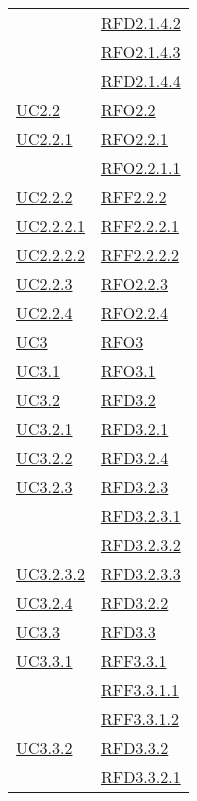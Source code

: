 \begin{longtable}{|>{\centering}m{5cm}|m{5cm}<{\centering}|}
& \hyperlink{RFD2.1.4.2}{RFD2.1.4.2}\\
& \hyperlink{RFO2.1.4.3}{RFO2.1.4.3}\\
& \hyperlink{RFD2.1.4.4}{RFD2.1.4.4}\\ \hline
\hyperref[UC2.2]{UC2.2} & \hyperlink{RFO2.2}{RFO2.2}\\ \hline
\hyperref[UC2.2.1]{UC2.2.1} & \hyperlink{RFO2.2.1}{RFO2.2.1}\\
& \hyperlink{RFO2.2.1.1}{RFO2.2.1.1}\\ \hline
\hyperref[UC2.2.2]{UC2.2.2} & \hyperlink{RFF2.2.2}{RFF2.2.2}\\ \hline
\hyperref[UC2.2.2.1]{UC2.2.2.1} & \hyperlink{RFF2.2.2.1}{RFF2.2.2.1}\\ \hline
\hyperref[UC2.2.2.2]{UC2.2.2.2} & \hyperlink{RFF2.2.2.2}{RFF2.2.2.2}\\ \hline
\hyperref[UC2.2.3]{UC2.2.3} & \hyperlink{RFO2.2.3}{RFO2.2.3}\\ \hline
\hyperref[UC2.2.4]{UC2.2.4} & \hyperlink{RFO2.2.4}{RFO2.2.4}\\ \hline
\hyperref[UC3]{UC3} & \hyperlink{RFO3}{RFO3}\\ \hline
\hyperref[UC3.1]{UC3.1} & \hyperlink{RFO3.1}{RFO3.1}\\ \hline
\hyperref[UC3.2]{UC3.2} & \hyperlink{RFD3.2}{RFD3.2}\\ \hline
\hyperref[UC3.2.1]{UC3.2.1} & \hyperlink{RFD3.2.1}{RFD3.2.1}\\ \hline
\hyperref[UC3.2.2]{UC3.2.2} & \hyperlink{RFD3.2.4}{RFD3.2.4}\\ \hline
\hyperref[UC3.2.3]{UC3.2.3} & \hyperlink{RFD3.2.3}{RFD3.2.3}\\
& \hyperlink{RFD3.2.3.1}{RFD3.2.3.1}\\
& \hyperlink{RFD3.2.3.2}{RFD3.2.3.2}\\ \hline
\hyperref[UC3.2.3.2]{UC3.2.3.2} & \hyperlink{RFD3.2.3.3}{RFD3.2.3.3}\\ \hline
\hyperref[UC3.2.4]{UC3.2.4} & \hyperlink{RFD3.2.2}{RFD3.2.2}\\ \hline
\hyperref[UC3.3]{UC3.3} & \hyperlink{RFD3.3}{RFD3.3}\\ \hline
\hyperref[UC3.3.1]{UC3.3.1} & \hyperlink{RFF3.3.1}{RFF3.3.1}\\
& \hyperlink{RFF3.3.1.1}{RFF3.3.1.1}\\
& \hyperlink{RFF3.3.1.2}{RFF3.3.1.2}\\ \hline
\hyperref[UC3.3.2]{UC3.3.2} & \hyperlink{RFD3.3.2}{RFD3.3.2}\\
& \hyperlink{RFD3.3.2.1}{RFD3.3.2.1}\\ \hline

\end{longtable}
